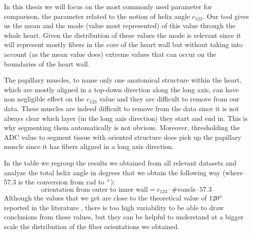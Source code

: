 In this thesis we will focus on the most commonly used parameter for comparison, the parameter related to the notion of helix angle $c_{123}$. Our tool gives us the mean and the mode (value most represented) of this value through the whole heart. Given the distribution of these values the mode is relevant since it will represent mostly fibers in the core of the heart wall but without taking into account (as the mean value does) extreme values that can occur on the boundaries of the heart wall.

The papillary muscles, to name only one anatomical structure within the heart, which are mostly aligned in a top-down direction along the long axis, can have non negligible effect on the $c_{123}$ value and they are difficult to remove from our data. These muscles are indeed difficult to remove from the data since it is not always clear which layer (in the long axis direction) they start and end in. This is why segmenting them automatically is not obvious. Moreover, thresholding the ADC value to segment tissue with oriented structure does pick up the papillary muscle since it has fibers aligned in a long axis direction.

In the table we regroup the results we obtained from all relevant datasets and analyze the total helix angle in degrees that we obtain the following way (where 57.3 is the conversion from rad to $^{\circ}$):
\begin{equation}
    \text{orientation from outer to inner wall} = c_{123}\cdot \text{\#voxels}\cdot 57.3
\end{equation}
Although the values that we get are close to the theoretical value of $120^{\circ}$ reported in the literature \cite{piuzephd}, there is too high variability to be able to draw conclusions from these values, but they can be helpful to understand at a bigger scale the distribution of the fiber orientations we obtained.

